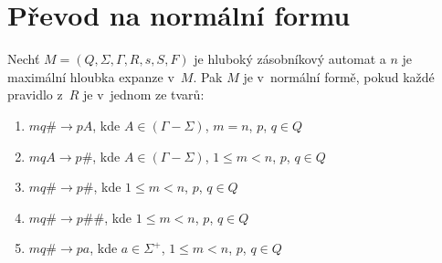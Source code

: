 



\section{Převod na normální formu}


\begin{Def}
Nechť $M = (Q,\Sigma,\Gamma, R, s, S , F)$ je hluboký zásobníkový automat
a $n$ je maximální hloubka expanze v~$M$.
Pak $M$ je v~normální formě, pokud každé pravidlo z~$R$ je v~jednom ze tvarů:

\begin{enumerate}
\renewcommand{\labelenumi}{(\roman{enumi})}
\item $mq\# \rightarrow pA$, kde $A \in (\Gamma - \Sigma)$, $m = n$, $p$, $q \in Q$
\item $mqA \rightarrow p\#$, kde $A \in (\Gamma - \Sigma)$, $1 \le m < n$, $p$, $q \in Q$
\item $mq\# \rightarrow p\#$, kde $1 \le m < n$, $p$, $q \in Q$
\item $mq\# \rightarrow p\#\#$, kde $1 \le m < n$, $p$, $q \in Q$
\item $mq\# \rightarrow pa$, kde $a \in {\Sigma}^+$, $1 \le m < n$, $p$, $q \in Q$

\end{enumerate}

\end{Def}


